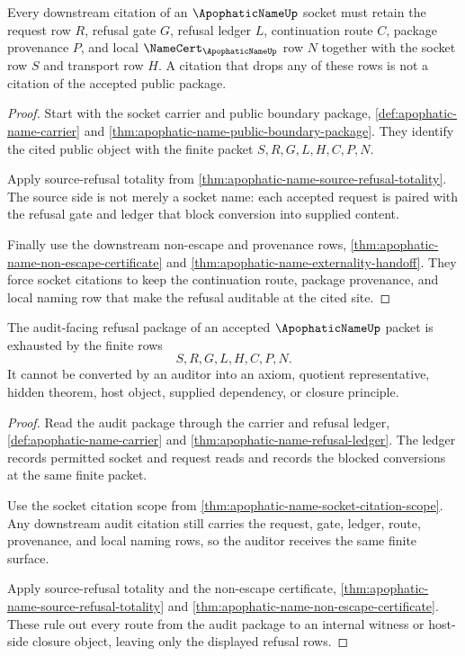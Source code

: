 \begin{theorem}\label{thm:apophatic-name-socket-citation-scope}
Every downstream citation of an $\ApophaticNameUp$ socket must retain the request row $R$, refusal gate $G$, refusal ledger $L$, continuation route $C$, package provenance $P$, and local $\NameCert_{\ApophaticNameUp}$ row $N$ together with the socket row $S$ and transport row $H$. A citation that drops any of these rows is not a citation of the accepted public package.
\end{theorem}
\begin{proof}
Start with the socket carrier and public boundary package, \autoref{def:apophatic-name-carrier} and \autoref{thm:apophatic-name-public-boundary-package}. They identify the cited public object with the finite packet $S,R,G,L,H,C,P,N$.

Apply source-refusal totality from \autoref{thm:apophatic-name-source-refusal-totality}. The source side is not merely a socket name: each accepted request is paired with the refusal gate and ledger that block conversion into supplied content.

Finally use the downstream non-escape and provenance rows, \autoref{thm:apophatic-name-non-escape-certificate} and \autoref{thm:apophatic-name-externality-handoff}. They force socket citations to keep the continuation route, package provenance, and local naming row that make the refusal auditable at the cited site.
\end{proof}

\begin{theorem}\label{thm:apophatic-name-refusal-audit-package}
The audit-facing refusal package of an accepted $\ApophaticNameUp$ packet is exhausted by the finite rows
$$
S,R,G,L,H,C,P,N.
$$
It cannot be converted by an auditor into an axiom, quotient representative, hidden theorem, host object, supplied dependency, or closure principle.
\end{theorem}
\begin{proof}
Read the audit package through the carrier and refusal ledger, \autoref{def:apophatic-name-carrier} and \autoref{thm:apophatic-name-refusal-ledger}. The ledger records permitted socket and request reads and records the blocked conversions at the same finite packet.

Use the socket citation scope from \autoref{thm:apophatic-name-socket-citation-scope}. Any downstream audit citation still carries the request, gate, ledger, route, provenance, and local naming rows, so the auditor receives the same finite surface.

Apply source-refusal totality and the non-escape certificate, \autoref{thm:apophatic-name-source-refusal-totality} and \autoref{thm:apophatic-name-non-escape-certificate}. These rule out every route from the audit package to an internal witness or host-side closure object, leaving only the displayed refusal rows.
\end{proof}


